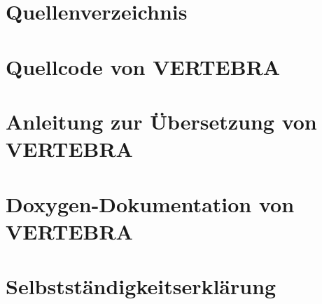 \documentclass[a4paper]{scrartcl}
\begin{document}
\section{Quellenverzeichnis}
\section{Quellcode von VERTEBRA}
\section{Anleitung zur Übersetzung von VERTEBRA}
\section{Doxygen-Dokumentation von VERTEBRA}
\section{Selbstständigkeitserklärung}


\end{document}
